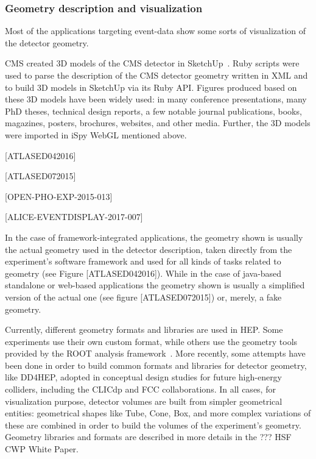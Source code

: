 \documentclass[12pt,a4paper]{article}
\begin{document}
\hypertarget{geometry-description}{%
\subsubsection{Geometry description and visualization}\label{geometry-description}}

Most of the applications targeting event-data show some sorts of visualization of the detector geometry.

CMS created 3D models of the CMS detector in SketchUp~\cite{CMSSketchUp}. Ruby scripts were used to parse the
description of the CMS detector geometry written in XML and to build 3D models in SketchUp via its Ruby API.
Figures produced based on these 3D models have been widely used: in many conference presentations, many PhD theses,
technical design reports, a few notable journal publications, books, magazines, posters, brochures, websites, and other media.
Further, the 3D models were imported in iSpy WebGL mentioned above.

[ATLASED042016]

[ATLASED072015]

[OPEN-PHO-EXP-2015-013]

[ALICE-EVENTDISPLAY-2017-007]

In the case of framework-integrated applications, the geometry shown is usually the actual geometry used in the detector description,
taken directly from the experiment’s software framework and used for all kinds of tasks related to geometry (see Figure [ATLASED042016]).
While in the case of  java-based standalone or web-based applications the geometry shown is usually a simplified version of the actual one
(see figure [ATLASED072015]) or, merely, a fake geometry.

Currently, different geometry formats and libraries are used in HEP. Some experiments use their own custom format,
while others use the geometry tools provided by the ROOT analysis framework~\cite{Root1997}. More recently, some attempts have been
done in order to build common formats and libraries for detector geometry, like DD4HEP,  adopted in conceptual design studies
for future high-energy colliders, including the CLICdp and FCC collaborations. In all cases, for visualization purpose, detector
volumes are built from simpler geometrical entities: geometrical shapes like Tube, Cone, Box, and more complex variations of these
are combined in order to build the volumes of the experiment’s geometry. Geometry libraries and formats are described in more details
in the ??? HSF CWP White Paper.
\end{document}
